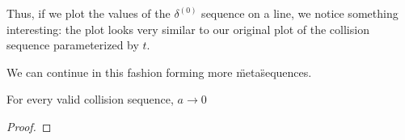 Thus, if we plot the values of the $\delta^{(0)}$ sequence on a line, we notice something interesting: the plot looks very similar to our original plot of the collision sequence parameterized by $t$.

We can continue in this fashion forming more \"meta\" sequences.



\begin{theorem}
	For every valid collision sequence, $a \to 0$
\end{theorem}

\begin{proof}

\end{proof}
